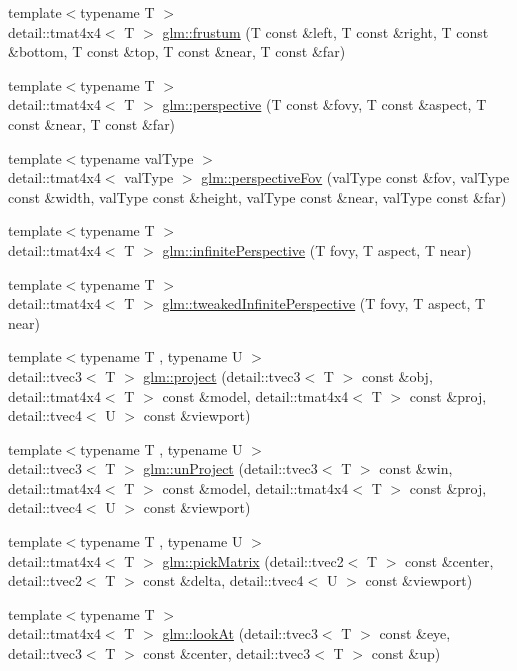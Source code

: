 \begin{DoxyCompactItemize}
{\footnotesize template$<$typename T $>$ }\\detail\+::tmat4x4$<$ T $>$ \hyperlink{group__gtc__matrix__transform_ga2a5b0a83f78884d9cf3cc1ba99131299}{glm\+::frustum} (T const \&left, T const \&right, T const \&bottom, T const \&top, T const \&near, T const \&far)
\item 
{\footnotesize template$<$typename T $>$ }\\detail\+::tmat4x4$<$ T $>$ \hyperlink{group__gtc__matrix__transform_ga283629a5ac7fb9037795435daf22560f}{glm\+::perspective} (T const \&fovy, T const \&aspect, T const \&near, T const \&far)
\item 
{\footnotesize template$<$typename val\+Type $>$ }\\detail\+::tmat4x4$<$ val\+Type $>$ \hyperlink{group__gtc__matrix__transform_gac2bbb4ae38c7cc549feefae5406517d7}{glm\+::perspective\+Fov} (val\+Type const \&fov, val\+Type const \&width, val\+Type const \&height, val\+Type const \&near, val\+Type const \&far)
\item 
{\footnotesize template$<$typename T $>$ }\\detail\+::tmat4x4$<$ T $>$ \hyperlink{group__gtc__matrix__transform_ga414f3cfe1af5619acebd5c28cf6bd45c}{glm\+::infinite\+Perspective} (T fovy, T aspect, T near)
\item 
{\footnotesize template$<$typename T $>$ }\\detail\+::tmat4x4$<$ T $>$ \hyperlink{group__gtc__matrix__transform_ga42299b3ef778f1d6120032da73b0ef87}{glm\+::tweaked\+Infinite\+Perspective} (T fovy, T aspect, T near)
\item 
{\footnotesize template$<$typename T , typename U $>$ }\\detail\+::tvec3$<$ T $>$ \hyperlink{group__gtc__matrix__transform_ga6f081067aeffc662410dfbabb25f9fdc}{glm\+::project} (detail\+::tvec3$<$ T $>$ const \&obj, detail\+::tmat4x4$<$ T $>$ const \&model, detail\+::tmat4x4$<$ T $>$ const \&proj, detail\+::tvec4$<$ U $>$ const \&viewport)
\item 
{\footnotesize template$<$typename T , typename U $>$ }\\detail\+::tvec3$<$ T $>$ \hyperlink{group__gtc__matrix__transform_ga540d5f6bb3f41e5dfa38d6ebd8771765}{glm\+::un\+Project} (detail\+::tvec3$<$ T $>$ const \&win, detail\+::tmat4x4$<$ T $>$ const \&model, detail\+::tmat4x4$<$ T $>$ const \&proj, detail\+::tvec4$<$ U $>$ const \&viewport)
\item 
{\footnotesize template$<$typename T , typename U $>$ }\\detail\+::tmat4x4$<$ T $>$ \hyperlink{group__gtc__matrix__transform_gaf711e3351e368706876106bc64673a91}{glm\+::pick\+Matrix} (detail\+::tvec2$<$ T $>$ const \&center, detail\+::tvec2$<$ T $>$ const \&delta, detail\+::tvec4$<$ U $>$ const \&viewport)
\item 
{\footnotesize template$<$typename T $>$ }\\detail\+::tmat4x4$<$ T $>$ \hyperlink{group__gtc__matrix__transform_gae2dca3785b6d5796e876114af58a60a1}{glm\+::look\+At} (detail\+::tvec3$<$ T $>$ const \&eye, detail\+::tvec3$<$ T $>$ const \&center, detail\+::tvec3$<$ T $>$ const \&up)
\end{DoxyCompactItemize}


